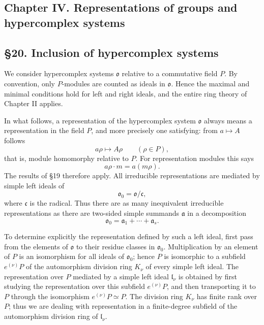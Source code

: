 \documentclass[11pt]{article}
\begin{document}
\subsection{Chapter IV. Representations of groups and hypercomplex
systems}\label{chapter-iv.-representations-of-groups-and-hypercomplex-systems}

\subsection{§20. Inclusion of hypercomplex
systems}\label{inclusion-of-hypercomplex-systems}

We consider hypercomplex systems \(\mathfrak{o}\) relative to a
commutative field \(P\). By convention, only \(P\)-modules are counted
as ideals in \(\mathfrak{o}\). Hence the maximal and minimal conditions
hold for left and right ideals, and the entire ring theory of Chapter II
applies.

In what follows, a representation of the hypercomplex system
\(\mathfrak{o}\) always means a representation in the field \(P\), and
more precisely one satisfying: from \(a\mapsto A\) follows \[
  a\rho\mapsto A\rho\qquad(\rho\in P),
\] that is, module homomorphy relative to \(P\). For representation
modules this says \[
  a\rho\cdot m=a(m\rho).
\] The results of §19 therefore apply. All irreducible representations
are mediated by simple left ideals of \[
  \mathfrak{o}_0=\mathfrak{o}/\mathfrak c,
\] where \(\mathfrak c\) is the radical. Thus there are as many
inequivalent irreducible representations as there are two-sided simple
summands \(\mathfrak a\) in a decomposition \[
  \mathfrak{o}_0=\mathfrak a_1+\cdots+\mathfrak a_s.
\]

To determine explicitly the representation defined by such a left ideal,
first pass from the elements of \(\mathfrak{o}\) to their residue
classes in \(\mathfrak{o}_0\). Multiplication by an element of \(P\) is
an isomorphism for all ideals of \(\mathfrak{o}_0\); hence \(P\) is
isomorphic to a subfield \(e^{(\nu)}P\) of the automorphism division
ring \(K_\nu\) of every simple left ideal. The representation over \(P\)
mediated by a simple left ideal \(\mathfrak l_\nu\) is obtained by first
studying the representation over this subfield \(e^{(\nu)}P\), and then
transporting it to \(P\) through the isomorphism \(e^{(\nu)}P\simeq P\).
The division ring \(K_\nu\) has finite rank over \(P\); thus we are
dealing with representation in a finite-degree subfield of the
automorphism division ring of \(\mathfrak l_\nu\).
\end{document}

